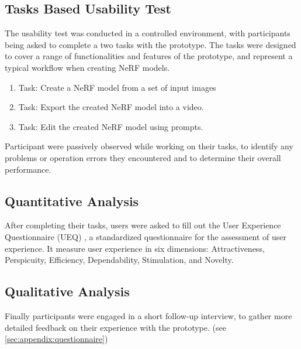 \subsection{Tasks Based Usability Test}
\label{sec:methodology:study:tasks}

The usability test was conducted in a controlled environment, with participants being asked to complete a two tasks with the prototype.
The tasks were designed to cover a range of functionalities and features of the prototype, and represent a typical workflow when creating NeRF models.

\begin{enumerate}
  \item Task: Create a NeRF model from a set of input images
  \item Task: Export the created NeRF model into a video.
  \item Task: Edit the created NeRF model using prompts.
\end{enumerate}

Participant were passively observed while working on their tasks, to identify any problems or operation errors they encountered and to determine their overall performance.

\subsection{Quantitative Analysis}
\label{sec:methodology:study:quantitative}

After completing their tasks, users were asked to fill out the User Experience Questionnaire (UEQ) \cite{ueq}, a standardized questionnaire for the assessment of user experience.
It measure user experience in six dimensions: Attractiveness, Perspicuity, Efficiency, Dependability, Stimulation, and Novelty.

\subsection{Qualitative Analysis}
\label{sec:methodology:study:qualitative}

Finally participants were engaged in a short follow-up interview, to gather more detailed feedback on their experience with the prototype. (see \ref{sec:appendix:questionnaire})


